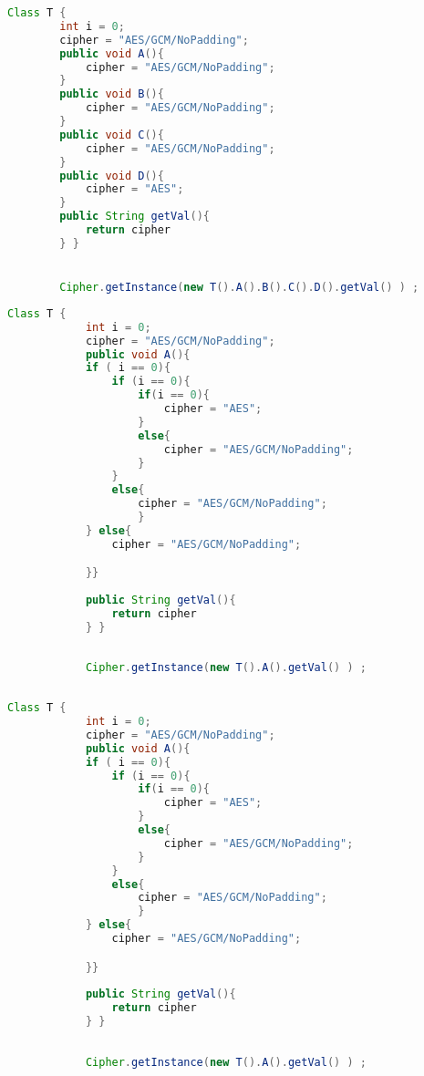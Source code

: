     \begin{lstlisting}[frame=tb,caption={\small Iterative Method Chaining}, label={lst:iterativechaining},language=java]
        Class T {
        int i = 0;
        cipher = "AES/GCM/NoPadding";
        public void A(){
            cipher = "AES/GCM/NoPadding";
        }
        public void B(){
            cipher = "AES/GCM/NoPadding";
        }
        public void C(){
            cipher = "AES/GCM/NoPadding";
        }
        public void D(){
            cipher = "AES";
        }
        public String getVal(){
            return cipher
        } }


        Cipher.getInstance(new T().A().B().C().D().getVal() ) ;
        \end{lstlisting}
        \vspace{-0.25em}
    

        \begin{lstlisting}[frame=tb,caption={\small Iterative Conditionals}, label={lst:iterativeconditionals},language=java]
            Class T {
            int i = 0;
            cipher = "AES/GCM/NoPadding";
            public void A(){
            if ( i == 0){
                if (i == 0){
                    if(i == 0){
                        cipher = "AES";
                    }
                    else{
                        cipher = "AES/GCM/NoPadding";
                    }
                }
                else{
                    cipher = "AES/GCM/NoPadding";
                    }
            } else{
                cipher = "AES/GCM/NoPadding";

            }}
            
            public String getVal(){
                return cipher
            } }
    
    
            Cipher.getInstance(new T().A().getVal() ) ;
                
            \end{lstlisting}
            \vspace{-0.25em}


\begin{lstlisting}[frame=tb,caption={\small Iterative Conditionals}, label={lst:iterativeconditionals},language=java]
            Class T {
            int i = 0;
            cipher = "AES/GCM/NoPadding";
            public void A(){
            if ( i == 0){
                if (i == 0){
                    if(i == 0){
                        cipher = "AES";
                    }
                    else{
                        cipher = "AES/GCM/NoPadding";
                    }
                }
                else{
                    cipher = "AES/GCM/NoPadding";
                    }
            } else{
                cipher = "AES/GCM/NoPadding";

            }}
            
            public String getVal(){
                return cipher
            } }
    
    
            Cipher.getInstance(new T().A().getVal() ) ;
                
            \end{lstlisting}
            \vspace{-0.25em}


